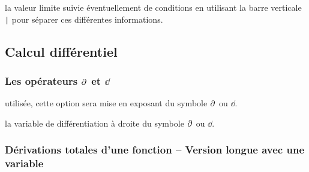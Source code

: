 \documentclass[12pt,a4paper]{article}
\theoremstyle{definition}
\begin{document}
 la valeur limite suivie éventuellement de conditions en utilisant la barre verticale \verb+|+ pour séparer ces différentes informations.


\subsection{Calcul différentiel}

\subsubsection{\texorpdfstring{Les opérateurs $\pp{}$ et $\dd{}$}%
                           {Les opérateurs "d rond" et "d droit"}}





\IDoption{} utilisée, cette option sera mise en exposant du symbole $\pp{}$ ou $\dd{}$.

\IDarg{} la variable de différentiation à droite du symbole $\pp{}$ ou $\dd{}$.




\subsubsection{Dérivations totales d'une fonction -- Version longue avec une variable}



\end{document}
